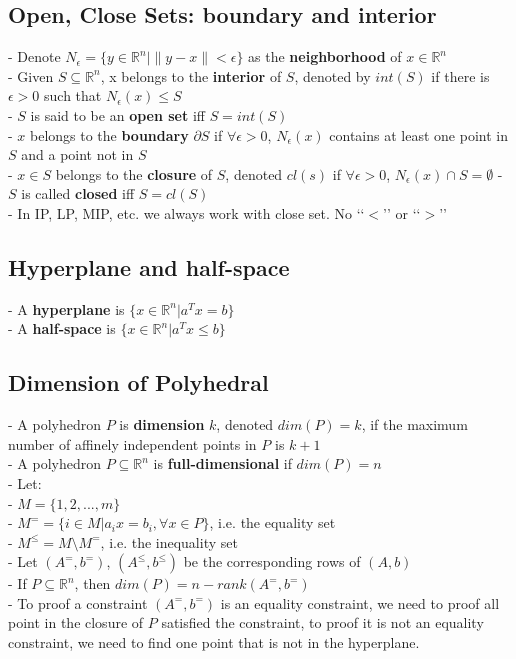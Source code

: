 			\subsection{Open, Close Sets: boundary and interior}
				- Denote $N_\epsilon = \{y\in \mathbb{R}^n|\lVert y-x\rVert < \epsilon \}$ as the \textbf{neighborhood} of $x\in \mathbb{R}^n$\\						
				- Given $S\subseteq \mathbb{R}^n$, x belongs to the \textbf{interior} of $S$, denoted by $int(S)$ if there is $\epsilon > 0$ such that $N_\epsilon(x) \le S$\\
				- $S$ is said to be an \textbf{open set} iff $S=int(S)$\\
				- $x$ belongs to the \textbf{boundary} $\partial S$ if $\forall \epsilon >0$, $N_\epsilon(x)$ contains at least one point in $S$ and a point not in $S$\\
				- $x\in S$ belongs to the \textbf{closure} of $S$, denoted $cl(s)$ if $\forall \epsilon > 0$, $N_\epsilon(x) \cap S = \emptyset$
				- $S$ is called \textbf{closed} iff $S=cl(S)$\\
				- In IP, LP, MIP, etc. we always work with close set. No \lq\lq{}$<$\rq\rq{} or \lq\lq{}$>$\rq\rq{}
				
			\subsection{Hyperplane and half-space}
				- A \textbf{hyperplane} is $\{x\in \mathbb{R}^n|a^Tx=b\}$\\
				- A \textbf{half-space} is  $\{x\in \mathbb{R}^n|a^Tx\le b\}$
				
			\subsection{Dimension of Polyhedral}
				- A polyhedron $P$ is \textbf{dimension} $k$, denoted $dim(P)=k$, if the maximum number of affinely independent points in $P$ is $k+1$\\
				- A polyhedron $P\subseteq \mathbb{R}^n$ is \textbf{full-dimensional} if $dim(P) = n$\\
				- Let:\\
				\indent - $M=\{1, 2, ..., m\}$\\
				\indent - $M^= = \{i \in M | a_ix=b_i, \forall x \in P\}$, i.e. the equality set\\
				\indent - $M^\le = M \setminus  M^=$, i.e. the inequality set\\
				- Let $(A^=, b^=)$, $(A^\le, b^\le)$ be the corresponding rows of $(A, b)$\\
				- If $P\subseteq \mathbb{R}^n$, then $dim(P) = n - rank(A^=, b^=)$\\
				- To proof a constraint $(A^=, b^=)$ is an equality constraint, we need to proof all point in the closure of $P$ satisfied the constraint, to proof it is not an equality constraint, we need to find one point that is not in the hyperplane.
			
